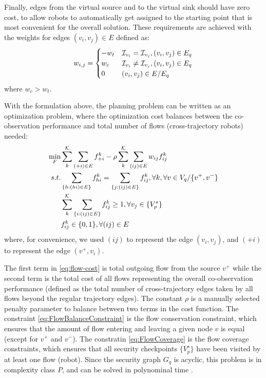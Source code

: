 \documentclass[journal]{IEEEtran}  %
\begin{document}
Finally, edges from the virtual source and to the virtual sink should have zero cost, to allow robots to automatically get assigned to the starting point that is most convenient for the overall solution.
These requirements are achieved with the weights for edges $(v_{i},v_{j})\in E$ defined as:
\begin{equation}
	w_{i,j}=\begin{cases}
	-w_{t} & \mathcal{I}_{v_{i}}=\mathcal{I}_{v_{j}}, (v_{i},v_{j})\in E_{q}\\
	w_{c} & \mathcal{I}_{v_{i}} \neq \mathcal{I}_{v_{j}}, (v_{i},v_{j})\in E_{q}\\
	0 &  (v_{i},v_{j})\in E / E_{q} 
	\end{cases}
\end{equation}
where $w_{c} > w_{t}$. 

With the formulation above, the planning problem can be written as an optimization problem, where the optimization cost balances between the co-observation performance and total number of flows (cross-trajectory robots) needed:
 \begin{subequations} \label{eq:flow-coverage-problem}
     \begin{align}
        \min_{F} & \sum^{\mathcal{K}}_{k} \sum_{(+i)\in E} f^{k}_{+i} - \rho \sum^{\mathcal{K}}_k \sum_{(ij)\in E} w_{ij} f^k_{ij} \label{eq:flow-cost}\\
        s.t. & \sum_{\{h:(hi) \in E\}}f^k_{hi}=\sum_{\{j:(ij) \in E\}}f^k_{ij},  \forall k,\forall v \in V_{q} / \{v^{+}, v^{-}\}  \label{eq:FlowBalanceConstraint}\\
        & \sum^{\mathcal{K}}_k\sum_{\{i:(ij)\in E \}} f^k_{ij} \geq 1, \forall v_{j} \in \{V^{s}_{p}\} \label{eq:FlowCoverage}\\
        & f^k_{ij} \in \{0,1\} ,  \forall (ij)\in E\label{eq:SingleFLowCapacity}
     \end{align}
 \end{subequations}
where, for convenience, we used $(ij)$ to represent the edge $(v_{i},v_{j})$, and $(+i)$ to represent the edge $(v^{+},v_{i})$.

The first term in \ref{eq:flow-cost} is total outgoing flow from the source $v^{+}$ while the second term is the total cost of all flows representing the overall co-observation performance (defined as the total number of cross-trajectory edges taken by all flows beyond the regular trajectory edges). The constant $\rho$ is a manually selected penalty parameter to balance between two terms in the cost function. The constraint \eqref{eq:FlowBalanceConstraint} is the flow conservation constraint, which ensures that the amount of flow entering and leaving a given node $v$ is equal (except for $v^{+}$ and $v^{-}$). The constratin \eqref{eq:FlowCoverage} is the flow coverage constraints, which ensures that all security checkpoints $ \{V^{s}_{p}\}$ have been visited by at least one flow (robot). Since the security graph $G_{q}$ is acyclic, this problem is in complexity class $P$, and can be solved in polynominal time \cite{1702662}. 
\end{document}
